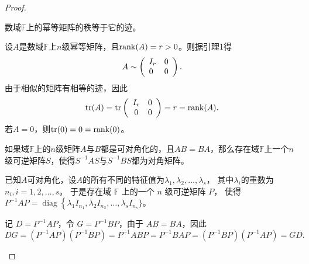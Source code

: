 \begin{enumerate}[1~]
\begin{proof}
\begin{lemma}
数域$\mathbb{F}$上的幂等矩阵的秩等于它的迹。
\end{lemma}
\begin{subproof}
设$A$是数域$\mathbb{F}$上$n$级幂等矩阵，且${\rm rank}(A)=r>0$。则据引理1得\[
A \sim \left( \begin{array} { l l } { I _ { r } } & { 0 } \\ { 0 } & { 0 } \end{array} \right).
\]
由于相似的矩阵有相等的迹，因此\[
\operatorname { tr } ( A ) = \operatorname { tr } \left( \begin{array} { c c } { I _ { r } } & { 0 } \\ { 0 } & { 0 } \end{array} \right) = r = \operatorname { rank } ( A ).
\]
若$A=0$，则${\rm tr}(0)=0={\rm rank}(0)$。
\end{subproof}

\begin{lemma}
 如果域$\mathbb{F}$上的$n$级矩阵$A$与$B$都是可对角化的，且$AB=BA$，那么存在域$\mathbb{F}$上一个$n$级可逆矩阵$S$，使得$S^{-1}AS$与$S^{-1}BS$都为对角矩阵。
\end{lemma}
\begin{subproof}
已知$A$可对角化，设$A$的所有不同的特征值为$\lambda _ { 1 } , \lambda _ { 2 } , \dots , \lambda _ { s }$，
其中$\lambda_i$的重数为$n_i, i=1, 2, \dots, s$。
于是存在域 $\mathbb{F}$ 上的一个 $n$ 级可逆矩阵 $P$，
使得 $P ^ { - 1 } A P = \operatorname { diag } \left\{ \lambda _ { 1 } I _ { n _ { 1 }} , \lambda _ { 2 } I _ { n _ { 2 } } , \dots , \lambda _ { s } I _ { n _ { s } } \} \right.$。

记 $D=P^{-1}AP$，令 $G=P^{-1}BP$，由于 $AB=BA$，因此\[
D G = \left( P ^ { - 1 } A P \right) \left( P ^ { - 1 } B P \right) = P ^ { - 1 } A B P = P ^ { - 1 } B A P = \left( P ^ { - 1 } B P \right) \left( P ^ { - 1 } A P \right) = G D.
\]


\end{subproof}
\end{proof}
\end{enumerate}
